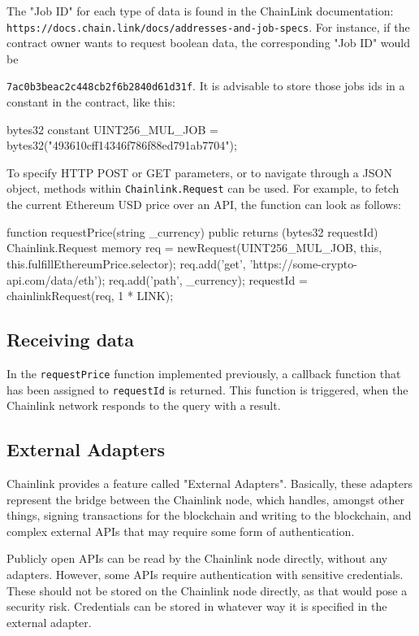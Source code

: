 The "Job ID" for each type of data is found in the ChainLink documentation: \texttt{https://docs.chain.link/docs/addresses-and-job-specs}. For instance, if the contract owner wants to request boolean data, the corresponding "Job ID" would be
 
\texttt{7ac0b3beac2c448cb2f6b2840d61d31f}. It is advisable to store those jobs ids in a constant in the contract, like this:

\begin{SolidityCode}
bytes32 constant UINT256_MUL_JOB = bytes32("493610cff14346f786f88ed791ab7704");
\end{SolidityCode}

To specify HTTP POST or GET parameters, or to navigate through a JSON object, methods within \texttt{Chainlink.Request} can be used. For example, to fetch the current Ethereum USD price over an API, the function can look as follows:
\begin{SolidityCode}
function requestPrice(string _currency) public returns (bytes32 requestId) {
	Chainlink.Request memory req =
	newRequest(UINT256_MUL_JOB, this, this.fulfillEthereumPrice.selector);
	req.add('get', 'https://some-crypto-api.com/data/eth');
	req.add('path', _currency);
	requestId = chainlinkRequest(req, 1 * LINK);
}
\end{SolidityCode}

\subsection*{Receiving data}
In the \texttt{requestPrice} function implemented previously, a callback function that has been assigned to \texttt{requestId} is returned. This function is triggered, when the Chainlink network responds to the query with a result. 
\subsection*{External Adapters}
Chainlink provides a feature called "External Adapters". Basically, these adapters represent the bridge between the Chainlink node, which handles, amongst other things, signing transactions for the blockchain and writing to the blockchain, and complex external APIs that may require some form of authentication.

Publicly open APIs can be read by the Chainlink node directly, without any adapters. However, some APIs require authentication with sensitive credentials. These should not be stored on the Chainlink node directly, as that would pose a security risk. Credentials can be stored in whatever way it is specified in the external adapter.

